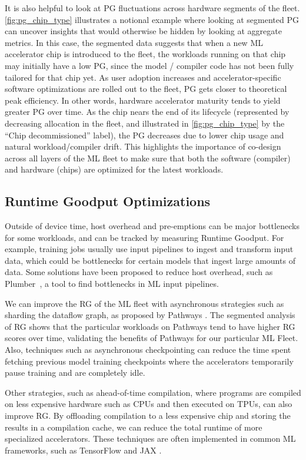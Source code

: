 It is also helpful to look at PG fluctuations across hardware segments of the fleet. \autoref{fig:pg_chip_type} illustrates a notional example where looking at segmented PG can uncover insights that would otherwise be hidden by looking at aggregate metrics. In this case, the segmented data suggests that when a new ML accelerator chip is introduced to the fleet, the workloads running on that chip may initially have a low PG, since the model / compiler code has not been fully tailored for that chip yet. As user adoption increases and accelerator-specific software optimizations are rolled out to the fleet, PG gets closer to theoretical peak efficiency. In other words, hardware accelerator maturity tends to yield greater PG over time. As the chip nears the end of its lifecycle (represented by decreasing allocation in the fleet, and illustrated in \autoref{fig:pg_chip_type} by the ``Chip decommissioned'' label), the PG decreases due to lower chip usage and natural workload/compiler drift. This highlights the importance of co-design across all layers of the ML fleet to make sure that both the software (compiler) and hardware (chips) are optimized for the latest workloads.
\subsection{Runtime Goodput Optimizations}
Outside of device time, host overhead and pre-emptions can be major bottlenecks for some workloads, and can be tracked by measuring Runtime Goodput. For example, training jobs usually use input pipelines to ingest and transform input data, which could be bottlenecks for certain models that ingest large amounts of data. Some solutions have been proposed to reduce host overhead, such as Plumber~\cite{kuchnik2022plumber}, a tool to find bottlenecks in ML input pipelines. 

We can improve the RG of the ML fleet with asynchronous strategies such as sharding the dataflow graph, as proposed by Pathways \cite{barham2022pathways}. The segmented analysis of RG shows that the particular workloads on Pathways tend to have higher RG scores over time, validating the benefits of Pathways for our particular ML Fleet. Also, techniques such as asynchronous checkpointing \citep{maurya2024datastates, nicolae2020deepfreeze} can reduce the time spent fetching previous model training checkpoints where the accelerators temporarily pause training and are completely idle.  


Other strategies, such as ahead-of-time compilation, where programs are compiled on less expensive hardware such as CPUs and then executed on TPUs, can also improve RG. By offloading compilation to a less expensive chip and storing the results in a compilation cache, we can reduce the total runtime of more specialized accelerators. These techniques are often implemented in common ML frameworks, such as TensorFlow \cite{aotTF} and JAX \cite{aotJAX}.


